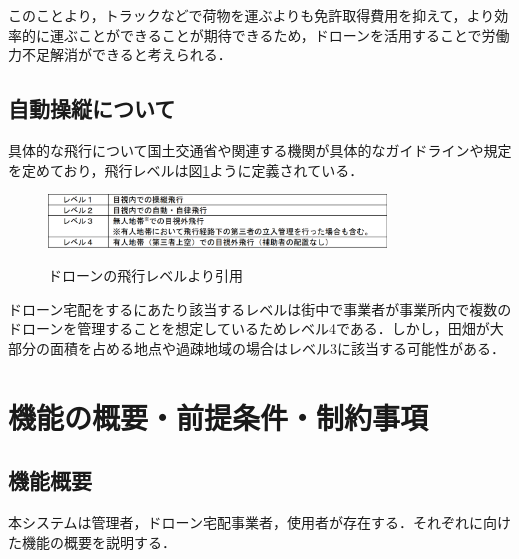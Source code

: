 \documentclass[a4paper, titlepage]{jsarticle}
\begin{document}
このことより，トラックなどで荷物を運ぶよりも免許取得費用を抑えて，より効率的に運ぶことができることが期待できるため，ドローンを活用することで労働力不足解消ができると考えられる．


\subsection{自動操縦について}
具体的な飛行について国土交通省や関連する機関が具体的なガイドラインや規定を定めており，飛行レベルは図\ref{fig:dron_level}ように定義されている．
\begin{figure}[htbp]
  \centering
  \includegraphics[width=0.8\textwidth]{flying_level.pdf}
  \label{fig:dron_level}
  \caption{ドローンの飛行レベル\cite{delivery_guidelines_2023}より引用}
\end{figure}

ドローン宅配をするにあたり該当するレベルは街中で事業者が事業所内で複数のドローンを管理することを想定しているためレベル4である．しかし，田畑が大部分の面積を占める地点や過疎地域の場合はレベル3に該当する可能性がある．



\section{機能の概要・前提条件・制約事項}
\subsection{機能概要}
本システムは管理者，ドローン宅配事業者，使用者が存在する．それぞれに向けた機能の概要を説明する．
\end{document}
